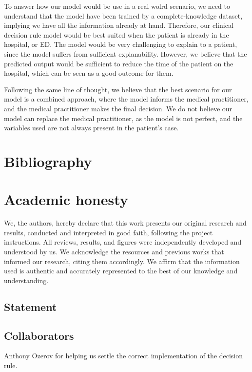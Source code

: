 \documentclass[10pt,letterpaper]{article}
\begin{document}
To answer how our model would be use in a real wolrd scenario, we need to understand that the model have been 
trained by a complete-knowledge dataset, implying we have all the information already at hand. Therefore, 
our clinical decision rule model would be best suited when the patient is already in the hospital, or ED.
The model would be very challenging to explain to a patient, since the model suffers from sufficient 
explanability. However, we believe that the predicted output would be sufficient to reduce the time of the 
patient on the hospital, which can be seen as a good outcome for them.

Following the same line of thought, we believe that the best scenario for our model is a combined approach, 
where the model informs the medical practitioner, and the medical practitioner makes the final decision. 
We do not believe our model can replace the medical practitioner, as the model is not perfect, and the variables
used are not always present in the patient's case.


\newpage
\section{Bibliography}

 

\appendix
\section{Academic honesty}
We, the authors, hereby declare that this work presents our original research and results, conducted and interpreted in good faith, following the project instructions. All reviews, results, and figures were independently developed and understood by us. We acknowledge the resources and previous works that informed our research, citing them accordingly. We affirm that the information used is authentic and accurately represented to the best of our knowledge and understanding.

\subsection{Statement}

\subsection{Collaborators}
Anthony Ozerov for helping us settle the correct implementation of the decision rule.
\end{document}
